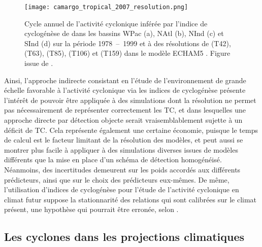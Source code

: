 \documentclass[../main.tex]{subfiles}
\begin{document}
\begin{figure}[tb]
    \centering
    \texttt{[image: camargo\_tropical\_2007\_resolution.png]}
    \caption{Cycle annuel de l'activité cyclonique inférée par l'indice de cyclogénèse de \cite{emanuel_tropical_2004} dans les bassins WPac (a), NAtl (b), NInd
    (c) et SInd (d) sur la période \num{1978}~--~\num{1999} et à des résolutions de  (T42),  (T63),  (T85),  (T106) et 
    (T159) dans le modèle ECHAM5 \parencite{roeckner_atmospheric_2003}. Figure issue de \cite{camargo_tropical_2007}.}
    \label{fig:GP_resolution}
\end{figure}


Ainsi, l'approche indirecte consistant en l'étude de l'environnement de grande échelle favorable à l'activité cyclonique via les indices de cyclogénèse présente
l'intérêt de pouvoir être appliquée à des simulations dont la résolution ne permet pas nécessairement de représenter correctement les TC, et dans lesquelles une
approche directe par détection objecte serait vraisemblablement sujette à un déficit de TC. Cela représente également une certaine économie, puisque le temps de
calcul est le facteur limitant de la résolution des modèles, et peut aussi se montrer plus facile à appliquer à des simulations diverses issues de modèles
différents que la mise en place d'un schéma de détection homogénéisé. Néanmoins, des incertitudes demeurent sur les poids accordés aux différents prédicteurs,
ainsi que sur le choix des prédicteurs eux-mêmes. De même, l'utilisation d'indices de cyclogénèse pour l'étude de l'activité cyclonique en climat futur suppose
la stationnarité des relations qui sont calibrées sur le climat présent, une hypothèse qui pourrait être erronée, selon
\cite{nolan_increased_2008,murakami_changes_2013}.

\subsection{Les cyclones dans les projections climatiques}\label{sec:projections_futures}
\end{document}
